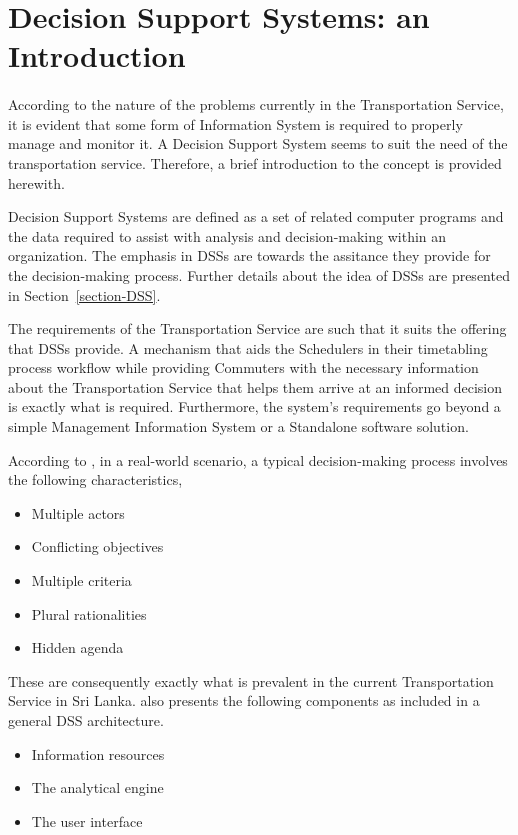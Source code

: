 \section{Decision Support Systems: an Introduction}
\label{section-DSSIntro}

\paragraph{} According to the nature of the problems currently in the Transportation Service, it is evident that some form of Information System is required to properly manage and monitor it. A Decision Support System seems to suit the need of the transportation service. Therefore, a brief introduction to the concept is provided herewith.

Decision Support Systems are defined as a set of related computer programs and the data required to assist with analysis and decision-making within an organization. The emphasis in DSSs are towards the assitance they provide for the decision-making process. Further details about the idea of DSSs are presented in Section~\ref{section-DSS}.

The requirements of the Transportation Service are such that it suits the offering that DSSs provide. A mechanism that aids the Schedulers in their timetabling process workflow while providing Commuters with the necessary information about the Transportation Service that helps them arrive at an informed decision is exactly what is required. Furthermore, the system's requirements go beyond a simple Management Information System or a Standalone software solution. 

According to \cite{Fedra2000}, in a real-world scenario, a typical decision-making process involves the following characteristics,

\begin {itemize}
\item Multiple actors
\item Conflicting objectives
\item Multiple criteria
\item Plural rationalities
\item Hidden agenda
\end {itemize}

These are consequently exactly what is prevalent in the current Transportation Service in Sri Lanka. \cite{Fedra2000} also presents the following components as included in a general DSS architecture.

\begin {itemize}
\item Information resources
\item The analytical engine
\item The user interface
\end {itemize}

